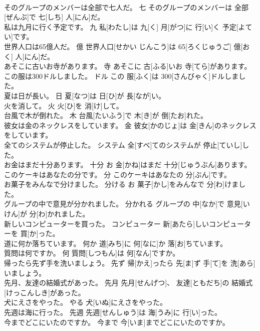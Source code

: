 \documentclass[8pt]{extreport}
\begin{document}
\begin{CJK}{UTF8}{min}
\\	そのグループのメンバーは全部で七人だ。	七	そのグループのメンバーは 全部[ぜんぶ]で 七[しち] 人[にん]だ。	
\\	私は九月に行く予定です。	九	私[わたし]は 九[く] 月[がつ]に 行[い]く 予定[よてい]です。	
\\	世界人口は65億人だ。	億	世界人口[せかい じんこう]は 65[ろくじゅうご] 億[おく] 人[にん]だ。	
\\	あそこに古いお寺があります。	寺	あそこに 古[ふる]いお 寺[てら]があります。	
\\	この服は300ドルしました。	ドル	この 服[ふく]は 300[さんびゃく]ドルしました。	
\\	夏は日が長い。	日	夏[なつ]は 日[ひ]が 長[なが]い。	
\\	火を消して。	火	火[ひ]を 消[け]して。	
\\	台風で木が倒れた。	木	台風[たいふう]で 木[き]が 倒[たお]れた。	
\\	彼女は金のネックレスをしています。	金	彼女[かのじょ]は 金[きん]のネックレスをしています。	
\\	全てのシステムが停止した。	システム	全[すべ]てのシステムが 停止[ていし]した。	
\\	お金はまだ十分あります。	十分	お 金[かね]はまだ 十分[じゅうぶん]あります。	
\\	このケーキはあなたの分です。	分	このケーキはあなたの 分[ぶん]です。	
\\	お菓子をみんなで分けました。	分ける	お 菓子[かし]をみんなで 分[わ]けました。	
\\	グループの中で意見が分かれました。	分かれる	グループの 中[なか]で 意見[いけん]が 分[わ]かれました。	
\\	新しいコンピューターを買った。	コンピューター	新[あたら]しいコンピューターを 買[か]った。	
\\	道に何か落ちています。	何か	道[みち]に 何[なに]か 落[お]ちています。	
\\	質問は何ですか。	何	質問[しつもん]は 何[なん]ですか。	
\\	帰ったら先ず手を洗いましょう。	先ず	帰[かえ]ったら 先[ま]ず 手[て]を 洗[あら]いましょう。	
\\	先月、友達の結婚式があった。	先月	先月[せんげつ]、 友達[ともだち]の 結婚式[けっこんしき]があった。	
\\	犬にえさをやった。	やる	犬[いぬ]にえさをやった。	
\\	先週は海に行った。	先週	先週[せんしゅう]は 海[うみ]に 行[い]った。	
\\	今までどこにいたのですか。	今まで	今[いま]までどこにいたのですか。	

\end{CJK}
\end{document}
